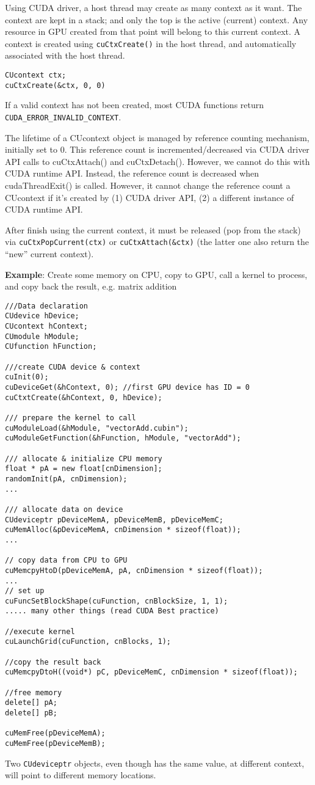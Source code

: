 Using CUDA driver, a host thread may create as many context as it want. The
context are kept in a stack; and only the top is the active (current) context.
Any resource in GPU created from that point will belong to this current context.
A context is created using \verb!cuCtxCreate()! in the host thread, and
automatically associated with the host thread.
\begin{verbatim}
CUcontext ctx;
cuCtxCreate(&ctx, 0, 0)
\end{verbatim}
If a valid context has not
been created, most CUDA functions  return \verb!CUDA_ERROR_INVALID_CONTEXT!.

The lifetime of a CUcontext object is managed by reference counting mechanism,
initially set to 0. This reference count is incremented/decreased via CUDA
driver API calls to cuCtxAttach() and cuCtxDetach(). However, we cannot do this with
CUDA runtime API. Instead, the reference count is decreased when
cudaThreadExit() is called. However, it cannot change the reference count a
CUcontext if it's created by (1) CUDA driver API, (2) a different instance
of CUDA runtime API.

After finish using the current context, it must
be released (pop from the stack) via \verb!cuCtxPopCurrent(ctx)! or
\verb!cuCtxAttach(&ctx)! (the latter one also return the ``new'' current
context).


{\bf Example}: Create some memory on CPU, copy to GPU, call a kernel
to process, and copy back the result, e.g. matrix addition
\begin{lstlisting}
///Data declaration
CUdevice hDevice;
CUcontext hContext;
CUmodule hModule;
CUfunction hFunction;

///create CUDA device & context
cuInit(0);
cuDeviceGet(&hContext, 0); //first GPU device has ID = 0
cuCtxtCreate(&hContext, 0, hDevice);

/// prepare the kernel to call
cuModuleLoad(&hModule, "vectorAdd.cubin");
cuModuleGetFunction(&hFunction, hModule, "vectorAdd");

/// allocate & initialize CPU memory
float * pA = new float[cnDimension];
randomInit(pA, cnDimension);
...

/// allocate data on device
CUdeviceptr pDeviceMemA, pDeviceMemB, pDeviceMemC;
cuMemAlloc(&pDeviceMemA, cnDimension * sizeof(float));
...

// copy data from CPU to GPU
cuMemcpyHtoD(pDeviceMemA, pA, cnDimension * sizeof(float));
...
// set up 
cuFuncSetBlockShape(cuFunction, cnBlockSize, 1, 1);
..... many other things (read CUDA Best practice)

//execute kernel
cuLaunchGrid(cuFunction, cnBlocks, 1);

//copy the result back
cuMemcpyDtoH((void*) pC, pDeviceMemC, cnDimension * sizeof(float));

//free memory
delete[] pA;
delete[] pB;

cuMemFree(pDeviceMemA);
cuMemFree(pDeviceMemB);
\end{lstlisting}
Two \verb!CUdeviceptr!  objects, even though has the same value,
at different context, will point to different memory locations.

